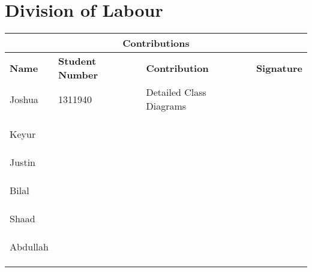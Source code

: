 \documentclass[]{article}
\begin{document}
\section{Division of Labour} \label{dlabour}
\begin{tabular}{ |p{3cm}||p{2cm}|p{6cm}|p{1.5cm}|  }
 \hline
 \multicolumn{4}{|c|}{Contributions} \\
 \hline
 \textbf{Name}& \textbf{Student Number}& \textbf{Contribution}& \textbf{Signature}\\
 \hline
 Joshua & 1311940 & Detailed Class Diagrams &   \\ 
 &&&   \\
 &&&   \\
 &&&   \\
 \hline
 Keyur  &    &  &\\
 &&&   \\
 &&&   \\
 &&&   \\
 \hline
 Justin &&& \\
 &&&   \\
 &&&   \\
 &&&   \\
 \hline
 Bilal & & & \\
 &&&   \\
 &&&   \\
 &&&   \\
 \hline
 Shaad &  & &\\
 &&&   \\
 &&&   \\
 &&&   \\
 \hline
 Abdullah & &  &\\
 &&&   \\
 &&&   \\
 &&&   \\
 \hline
\end{tabular}
\end{document}
